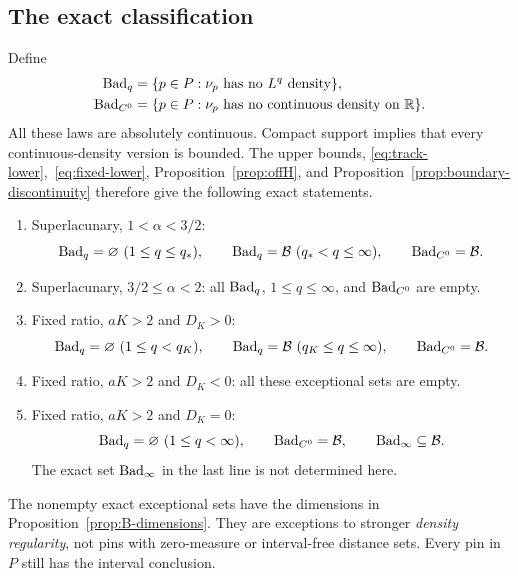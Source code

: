 \subsection{The exact classification}
Define
\begin{align*}
 \operatorname{Bad}_q&=\{p\in P:\nu_p\text{ has no }L^q\text{ density}\},\\
 \operatorname{Bad}_{C^0}&=\{p\in P:\nu_p\text{ has no continuous density on }\mathbb R\}.
\end{align*}
All these laws are absolutely continuous. Compact support implies that
every continuous-density version is bounded. The upper bounds,
\eqref{eq:track-lower},~\eqref{eq:fixed-lower},
Proposition~\ref{prop:offH}, and Proposition~\ref{prop:boundary-discontinuity}
therefore give the following exact statements.
\begin{enumerate}[leftmargin=*]
\item Superlacunary, $1<\alpha<3/2$:
\[
 \operatorname{Bad}_q=\varnothing\ (1\leq q\leq q_*),\qquad
 \operatorname{Bad}_q=\mathcal B\ (q_*<q\leq\infty),\qquad
 \operatorname{Bad}_{C^0}=\mathcal B.
\]
\item Superlacunary, $3/2\leq\alpha<2$: all $\operatorname{Bad}_q$,
$1\leq q\leq\infty$, and $\operatorname{Bad}_{C^0}$ are empty.
\item Fixed ratio, $aK>2$ and $D_K>0$:
\[
 \operatorname{Bad}_q=\varnothing\ (1\leq q<q_K),\qquad
 \operatorname{Bad}_q=\mathcal B\ (q_K\leq q\leq\infty),\qquad
 \operatorname{Bad}_{C^0}=\mathcal B.
\]
\item Fixed ratio, $aK>2$ and $D_K<0$: all these exceptional sets
are empty.
\item Fixed ratio, $aK>2$ and $D_K=0$:
\[
 \operatorname{Bad}_q=\varnothing\ (1\leq q<\infty),\qquad
 \operatorname{Bad}_{C^0}=\mathcal B,\qquad \operatorname{Bad}_\infty\subseteq\mathcal B.
\]
The exact set $\operatorname{Bad}_\infty$ in the last line is not determined here.
\end{enumerate}
The nonempty exact exceptional sets have the dimensions in
Proposition~\ref{prop:B-dimensions}. They are exceptions to stronger
\emph{density regularity}, not pins with zero-measure or interval-free
distance sets. Every pin in $P$ still has the interval conclusion.

